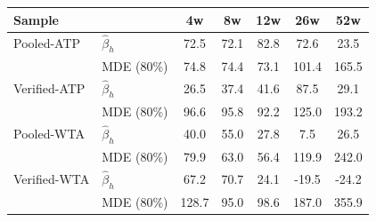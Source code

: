 \begin{tabular}{ll*{5}{c}}
\toprule
Sample & & 4w & 8w & 12w & 26w & 52w \\
\midrule
Pooled-ATP & $\hat{\beta}_h$ & 72.5 & 72.1 & 82.8 & 72.6 & 23.5 \\
 & MDE (80\%) & 74.8 & 74.4 & 73.1 & 101.4 & 165.5 \\[0.3em]
Verified-ATP & $\hat{\beta}_h$ & 26.5 & 37.4 & 41.6 & 87.5 & 29.1 \\
 & MDE (80\%) & 96.6 & 95.8 & 92.2 & 125.0 & 193.2 \\[0.3em]
Pooled-WTA & $\hat{\beta}_h$ & 40.0 & 55.0 & 27.8 & 7.5 & 26.5 \\
 & MDE (80\%) & 79.9 & 63.0 & 56.4 & 119.9 & 242.0 \\[0.3em]
Verified-WTA & $\hat{\beta}_h$ & 67.2 & 70.7 & 24.1 & -19.5 & -24.2 \\
 & MDE (80\%) & 128.7 & 95.0 & 98.6 & 187.0 & 355.9 \\[0.3em]
\bottomrule
\end{tabular}
